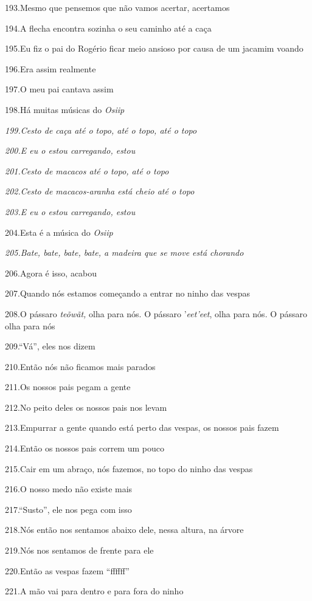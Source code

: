 193.Mesmo que pensemos que não vamos acertar, acertamos

194.A flecha encontra sozinha o seu caminho até a caça

195.Eu fiz o pai do Rogério ficar meio ansioso por causa de um jacamim
voando

196.Era assim realmente

197.O meu pai cantava assim

198.Há muitas músicas do \emph{Osiip}

\emph{199.Cesto de caça até o topo, até o topo, até o topo}

\emph{200.E eu o estou carregando, estou }

\emph{201.Cesto de macacos até o topo, até o topo}

\emph{202.Cesto de macacos-aranha está cheio até o topo}

\emph{203.E eu o estou carregando, estou}

204.Esta é a música do \emph{Osiip}

\emph{205.Bate, bate, bate, bate, a madeira que se move está chorando}

206.Agora é isso, acabou

207.Quando nós estamos começando a entrar no ninho das vespas

208.O pássaro \emph{teõwãt,} olha para nós. O pássaro '\emph{eet'eet},
olha para nós. O pássaro olha para nós

209.``Vá'', eles nos dizem

210.Então nós não ficamos mais parados

211.Os nossos pais pegam a gente

212.No peito deles os nossos pais nos levam

213.Empurrar a gente quando está perto das vespas, os nossos pais fazem

214.Então os nossos pais correm um pouco

215.Cair em um abraço, nós fazemos, no topo do ninho das vespas

216.O nosso medo não existe mais

217.``Susto'', ele nos pega com isso

218.Nós então nos sentamos abaixo dele, nessa altura, na árvore

219.Nós nos sentamos de frente para ele

220.Então as vespas fazem ``ffffff''

221.A mão vai para dentro e para fora do ninho

